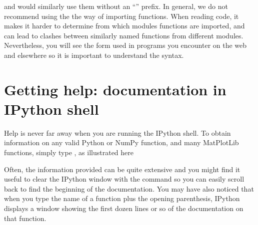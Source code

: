 \documentclass[letterpaper,10pt,english]{sphinxmanual}
\begin{document}
\begin{sphinxVerbatim}[commandchars=\\\{\}]
     
\end{sphinxVerbatim}

\sphinxAtStartPar
and would similarly use them without an “” prefix.  In general, we do not recommend using the the    way of importing functions.  When reading code, it makes it harder to determine from which modules functions are imported, and can lead to clashes between similarly named functions from different modules.  Nevertheless, you will see the form used in programs you encounter on the web and elsewhere so it is important to understand the syntax.


\section{Getting help: documentation in IPython shell}
\label{\detokenize{chap2/chap2_basics:getting-help-documentation-in-ipython-shell}}
\sphinxAtStartPar
Help is never far away when you are running the IPython shell.  To obtain information on any valid Python or NumPy function, and many MatPlotLib functions, simply type   \sphinxcode{\sphinxupquote{)}}, as illustrated here

\begin{sphinxVerbatim}[commandchars=\\\{\},numbers=left,firstnumber=1,stepnumber=1]

\end{sphinxVerbatim}

\sphinxAtStartPar
Often, the information provided can be quite extensive and you might find it useful to clear the IPython window with the  command so you can easily scroll back to find the beginning of the documentation.  You may have also noticed that when you type the name of a function plus the opening parenthesis, IPython displays a window showing the first dozen lines or so of the documentation on that function.
\end{document}
